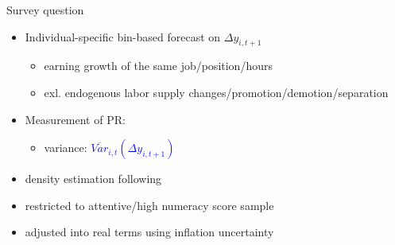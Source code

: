\documentclass{beamer}
\begin{document}
\begin{frame}{Survey question}
	\begin{itemize}
		\item Individual-specific bin-based forecast on $\Delta y_{i,t+1}$
		\begin{itemize}
			\item earning growth of the same job/position/hours
				\item exl. endogenous labor supply changes/promotion/demotion/separation 
		\end{itemize} 
		\item  Measurement of PR: 
		\begin{itemize}
			\item variance: \textcolor{blue}{$\overline {Var}_{i,t}(\Delta y_{i,t+1})$} 
		\end{itemize}
\item density estimation following \cite{engelberg_comparing_2009}			
\item restricted to attentive/high numeracy score sample
\item adjusted into real terms using inflation uncertainty 
\end{itemize}
\end{frame}
\end{document}
